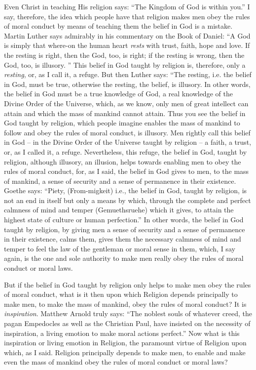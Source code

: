 Even Christ in teaching His religion says: ``The Kingdom of God is within you.''
I say, therefore, the idea which people have that religion makes men obey the rules of moral conduct by means of teaching them the belief in God is a mistake. Martin Luther says admirably in his commentary on the Book of Daniel: ``A God is simply that where-on the human heart \emph{rests} with trust, faith, hope and love. If the resting is right, then the God, too, is right; if the resting is wrong, then the God, too, is illusory.
'' This belief in God taught by religion is, therefore, only a \emph{resting}, or, as I call it, a refuge.
But then Luther says: ``The resting, i.e. the belief in God, must be true, otherwise the resting, the belief, is illusory.
In other words, the belief in God must be a true knowledge of God, a real knowledge of the Divine Order of the Universe, which, as we know, only men of great intellect can attain and which the mass of mankind cannot attain.
Thus you see the belief in God taught by religion, which people imagine enables the mass of mankind to follow and obey the rules of moral conduct, is illusory.
Men rightly call this belief in God -- in the Divine Order of the Universe taught by religion -- a faith, a trust, or, as I called it, a refuge.
Nevertheless, this refuge, the belief in God, taught by religion, although illusory, an illusion, helps towards enabling men to obey the rules of moral conduct, for, as I said, the belief in God gives to men, to the mass of mankind, a sense of security and a sense of permanence in their existence.
Goethe says: ``Piety, (From-migkeit) i.e., the belief in God, taught by religion, is not an end in itself but only a means by which, through the complete and perfect calmness of mind and temper (Gemuethsruehe) which it gives, to attain the highest state of culture or human perfection.''
In other words, the belief in God taught by religion, by giving men a sense of security and a sense of permanence in their existence, calms them, gives them the necessary calmness of mind and temper to feel the law of the gentleman or moral sense in them, which, I say again, is the one and sole authority to make men really obey the rules of moral conduct or moral laws.

But if the belief in God taught by religion only helps to make men obey the rules of moral conduct, what is it then upon which Religion depends principally to make men, to make the mass of mankind, obey the rules of moral conduct? It is \emph{inspiration}.
Matthew Arnold truly says: ``The noblest souls of whatever creed, the pagan Empedocles as well as the Christian Paul, have insisted on the necessity of inspiration, a living emotion to make moral actions perfect.''
Now what is this inspiration or living emotion in Religion, the paramount virtue of Religion upon which, as I said. Religion principally depends to make men, to enable and make even the mass of mankind obey the rules of moral conduct or moral laws?

